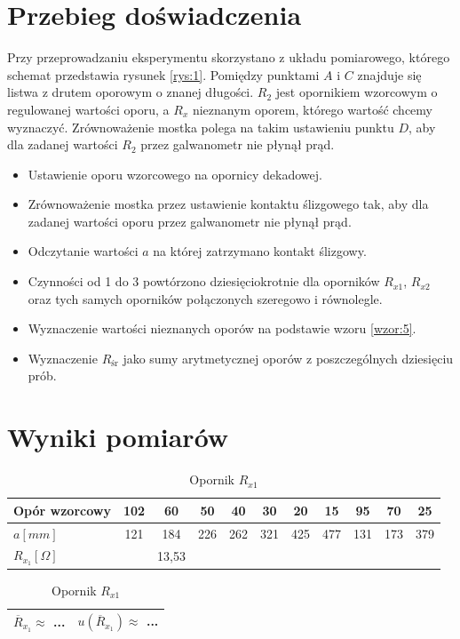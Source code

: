 \documentclass[a4paper,11pt]{article}
\begin{document}
\section{Przebieg doświadczenia}
\indent Przy przeprowadzaniu eksperymentu skorzystano z układu pomiarowego, którego schemat przedstawia rysunek {\ref{rys:1}}. 
\indent Pomiędzy punktami $A$ i $C$ znajduje się listwa z  drutem oporowym o znanej długości. $R_2$ jest opornikiem wzorcowym o regulowanej wartości oporu, a $R_x$ nieznanym oporem, którego wartość chcemy wyznaczyć. Zrównoważenie mostka polega na takim ustawieniu punktu $D$, aby dla zadanej wartości $R_2$ przez galwanometr nie płynął prąd.
\begin{itemize}
\item Ustawienie oporu wzorcowego na opornicy dekadowej.
\item Zrównoważenie mostka przez ustawienie kontaktu ślizgowego tak, aby dla zadanej wartości oporu przez galwanometr nie płynął prąd.
\item Odczytanie wartości $a$ na której zatrzymano kontakt ślizgowy.
\item Czynności od 1 do 3 powtórzono dziesięciokrotnie dla oporników $R_{x1}$, $R_{x2}$ oraz tych samych oporników połączonych szeregowo i równolegle.
\item Wyznaczenie wartości nieznanych oporów na podstawie wzoru {\ref{wzor:5}}.
\item Wyznaczenie $R_{\text{śr}}$ jako sumy arytmetycznej oporów z poszczególnych dziesięciu prób.
\end{itemize}

\section{Wyniki pomiarów}

\begin{table}[h!]
\caption{Opornik $R_{x1}$}
\begin{tabular}{|l|c|c|c|c|c|c|c|c|c|c|}\hline
\label{table1}
Opór wzorcowy & 102 & 60 & 50 & 40 & 30 & 20 & 15 & 95 & 70 & 25 \\ \hline
$a [mm]$ & 121 & 184 & 226 & 262 & 321 & 425 & 477 & 131 & 173 & 379 \\ \hline
$R_{x_{1}} [\Omega]$ &  & 13,53 & & & & & & & \\ \hline
\end{tabular}

\begin{tabular}{|l|l|}\hline
$ \overline{R}_{x_{1}} \approx$ ... & $u(\overline{R}_{x_{1}}) \approx$ ...  \\ \hline
\end{tabular}
\end{table}
\end{document}
